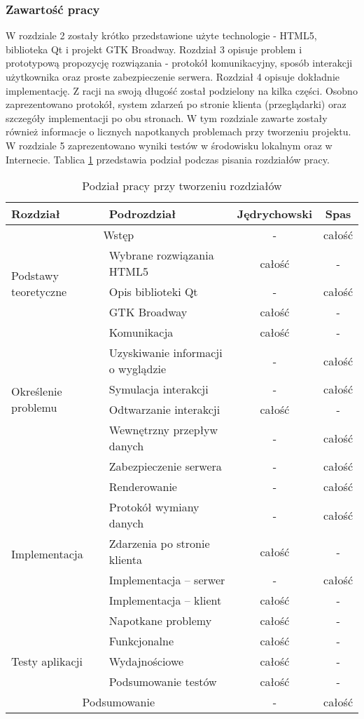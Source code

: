 \subsubsection{Zawartość pracy}

W rozdziale 2 zostały krótko przedstawione użyte technologie - HTML5, biblioteka Qt i projekt GTK Broadway. Rozdział 3 opisuje problem i prototypową propozycję rozwiązania - protokół komunikacyjny, sposób interakcji użytkownika oraz proste zabezpieczenie serwera. Rozdział 4 opisuje dokładnie implementację. Z racji na swoją długość został podzielony na kilka części. Osobno zaprezentowano protokół, system zdarzeń po stronie klienta (przeglądarki) oraz szczegóły implementacji po obu stronach. W tym rozdziale zawarte zostały również informacje o licznych napotkanych problemach przy tworzeniu projektu. W rozdziale 5 zaprezentowano wyniki testów w środowisku lokalnym oraz w Internecie.
Tablica \ref{tab:podzial} przedstawia podział podczas pisania rozdziałów pracy.

\begin{table}
\centering  
\begin{tabular}{ |l|l|c|c|}
\hline
Rozdział & Podrozdział              & Jędrychowski & Spas   \\
\hline
\multicolumn{2}{|c|}{Wstęp} & - & całość \\
\hline 
\multirow{3}{*}{Podstawy teoretyczne} & Wybrane rozwiązania HTML5 & całość & -  \\
 & Opis biblioteki Qt & - & całość  \\
 & GTK Broadway & całość & -  \\
 \hline
 \multirow{6}{*}{Określenie problemu} & Komunikacja & całość & -  \\
  & Uzyskiwanie informacji o wyglądzie & - & całość  \\
  & Symulacja interakcji & - & całość  \\
  & Odtwarzanie interakcji& całość & -  \\
  & Wewnętrzny przepływ danych & - & całość  \\
  & Zabezpieczenie serwera & - & całość  \\
  \hline
  \multirow{6}{*}{Implementacja} & Renderowanie & - & całość  \\
   & Protokół wymiany danych & - & całość  \\
   & Zdarzenia po stronie klienta & całość & -  \\
   & Implementacja -- serwer & - & całość  \\
   & Implementacja -- klient & całość & -  \\
   & Napotkane problemy & całość & -  \\
   \hline
   \multirow{3}{*}{Testy aplikacji} & Funkcjonalne & całość & -  \\
     & Wydajnościowe & całość & -  \\
     & Podsumowanie testów & całość & -  \\
   \hline
   \multicolumn{2}{|c|}{Podsumowanie} & - & całość \\
   \hline

\end{tabular}
\caption{Podział pracy przy tworzeniu rozdziałów}
\label{tab:podzial}
\end{table}